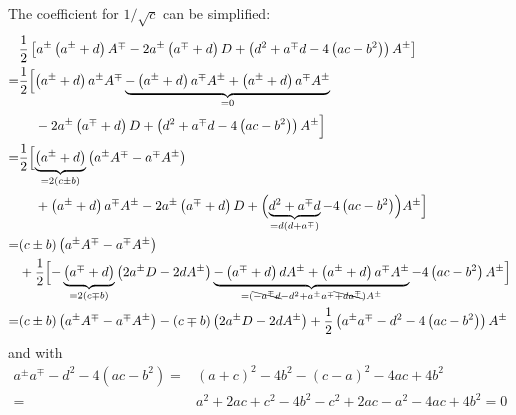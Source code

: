The coefficient for $1/\sqrt{c}$ can be simplified:
\begin{align}
 ~& \frac{1}{2} \left[
        a^{\pm} \left( a^{\pm} + d               \right) A^{\mp}
    - 2 a^{\pm} \left( a^{\mp} + d               \right) D
    +           \left( d^2 + a^{\mp}d -4\left(ac-b^2\right) \right) A^{\pm} \right] \nonumber \\
 =& \frac{1}{2} \Bigl[
                  \left( a^{\pm} + d \right) a^{\pm} A^{\mp}
    \underbrace{- \left( a^{\pm} + d \right) a^{\mp} A^{\pm}
                + \left( a^{\pm} + d \right) a^{\mp} A^{\pm}}_{=0} \nonumber \\
 ~& \phantom{\frac{1}{2} \Bigl[}
    - 2 a^{\pm} \left( a^{\mp} + d               \right) D
    +           \left( d^2 + a^{\mp}d -4\left(ac-b^2\right) \right) A^{\pm} \Bigr] \nonumber \\
 =& \frac{1}{2} \Bigl[
                \underbrace{\left( a^{\pm} + d \right)}_{=2(c\pm b)} \left( a^{\pm} A^{\mp} - a^{\mp} A^{\pm} \right) \nonumber \\
 ~& \phantom{\frac{1}{2} \Bigl[}
    +           \left( a^{\pm} + d \right) a^{\mp} A^{\pm}
    - 2 a^{\pm} \left( a^{\mp} + d               \right) D
    +           \Bigl( \underbrace{d^2 + a^{\mp}d}_{=d(d + a^{\mp})} -4\left(ac-b^2\right) \Bigr) A^{\pm} \Bigr] \nonumber \\
 =& (c \pm b) \left( a^{\pm} A^{\mp} - a^{\mp} A^{\pm} \right) \nonumber \\
 ~& + \frac{1}{2} \Bigl[
        - \underbrace{\left( a^{\mp} + d \right)}_{=2(c \mp b)}
            \left( 2 a^{\pm} D - 2 d A^{\pm} \right)
        \underbrace{- \left( a^{\mp} + d \right) d       A^{\pm}
                    + \left( a^{\pm} + d \right) a^{\mp} A^{\pm}}_{=\left(\bcancel{-a^{\mp}d} - d^2 + a^{\pm}a^{\mp} \bcancel{+d a^{\mp}}\right)A^{\pm}}
        - 4\left(ac-b^2\right) A^{\pm} \Bigr] \nonumber \\
 =&   (c \pm b) \left(   a^{\pm} A^{\mp} -   a^{\mp} A^{\pm} \right)
    - (c \mp b) \left( 2 a^{\pm} D       - 2 d       A^{\pm} \right)
    + \frac{1}{2} \left( a^{\pm}a^{\mp} - d^2 - 4\left(ac-b^2\right) \right) A^{\pm} \nonumber
\end{align}
and with
\begin{align}
     a^{\pm}a^{\mp} - d^2 - 4\left(ac-b^2\right)
  =& (a+c)^2 - 4b^2 - (c-a)^2 - 4ac+ 4b^2  \nonumber \\
  =& a^2 +2ac + c^2 - 4b^2 - c^2 +2ac - a^2 - 4ac + 4b^2  = 0 \label{eqn:apm_amp_d2_zero}
\end{align}
